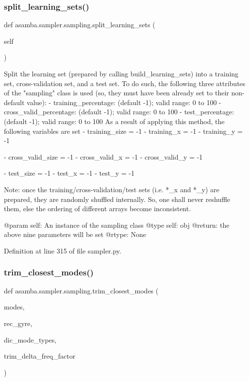 \subsubsection{\texorpdfstring{split\+\_\+learning\+\_\+sets()}{split\_learning\_sets()}}
{\footnotesize\ttfamily def asamba.\+sampler.\+sampling.\+split\+\_\+learning\+\_\+sets (\begin{DoxyParamCaption}\item[{}]{self }\end{DoxyParamCaption})}

\begin{DoxyVerb}Split the learning set (prepared by calling build_learning_sets) into a training set, cross-validation
set, and a test set. To do such, the following three attributes of the "sampling" class is used (so, they
must have been already set to their non-default value):
  - training_percentage: (default -1); valid range: 0 to 100
  - cross_valid_percentage: (default -1); valid range: 0 to 100
  - test_percentage: (default -1); valid range: 0 to 100
As a result of applying this method, the following variables are set
  - training_size = -1
  - training_x = -1
  - training_y = -1

  - cross_valid_size = -1
  - cross_valid_x = -1
  - cross_valid_y = -1

  - test_size = -1
  - test_x = -1
  - test_y = -1

Note: once the training/cross-validation/test sets (i.e. *_x and *_y) are prepared, they are randomly
  shuffled internally. So, one shall never reshuffle them, else the ordering of different arrays 
  become inconsistent.

@param self: An instance of the sampling class
@type self: obj
@return: the above nine parameters will be set
@rtype: None
\end{DoxyVerb}
 

Definition at line 315 of file sampler.\+py.

\mbox{\label{classasamba_1_1sampler_1_1sampling_a75e186291813796d1114ccf2e1f3b2c3}} 
\subsubsection{\texorpdfstring{trim\+\_\+closest\+\_\+modes()}{trim\_closest\_modes()}}
{\footnotesize\ttfamily def asamba.\+sampler.\+sampling.\+trim\+\_\+closest\+\_\+modes (\begin{DoxyParamCaption}\item[{}]{modes,  }\item[{}]{rec\+\_\+gyre,  }\item[{}]{dic\+\_\+mode\+\_\+types,  }\item[{}]{trim\+\_\+delta\+\_\+freq\+\_\+factor }\end{DoxyParamCaption})}



